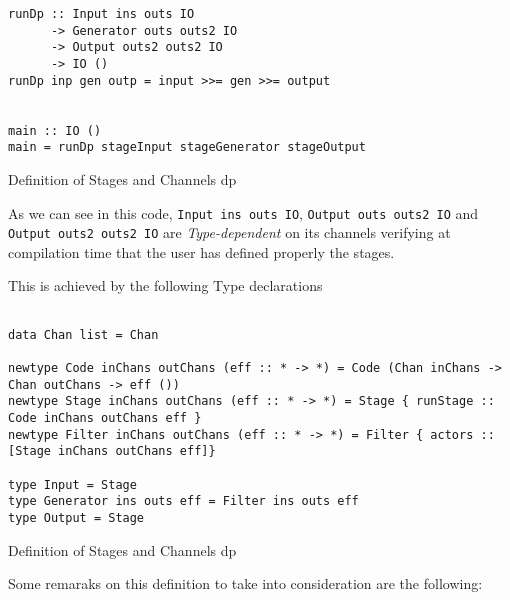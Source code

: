 \documentclass[preprint]{elsarticle}
\begin{document}
\begin{listing}[H]
\begin{verbatim}      
runDp :: Input ins outs IO 
      -> Generator outs outs2 IO 
      -> Output outs2 outs2 IO 
      -> IO ()
runDp inp gen outp = input >>= gen >>= output  


main :: IO ()
main = runDp stageInput stageGenerator stageOutput

\end{verbatim}
\caption{Definition of Stages and Channels \acrshort{dp}}
\label{src:haskell:lib:2}
\end{listing}

As we can see in this code, \texttt{Input ins outs IO}, \texttt{Output outs outs2 IO} and \texttt{Output outs2 outs2 IO} are \emph{Type-dependent} on its channels verifying at compilation time that the user has defined properly the stages.

This is achieved by the following Type declarations

\begin{listing}[H]
\begin{verbatim}      

data Chan list = Chan

newtype Code inChans outChans (eff :: * -> *) = Code (Chan inChans -> Chan outChans -> eff ())
newtype Stage inChans outChans (eff :: * -> *) = Stage { runStage :: Code inChans outChans eff }
newtype Filter inChans outChans (eff :: * -> *) = Filter { actors :: [Stage inChans outChans eff]}

type Input = Stage
type Generator ins outs eff = Filter ins outs eff
type Output = Stage

\end{verbatim}
\caption{Definition of Stages and Channels \acrshort{dp}}
\label{src:haskell:lib:3}
\end{listing}

Some remaraks on this definition to take into consideration are the following:
\end{document}
